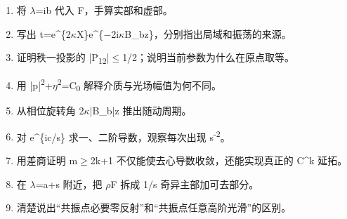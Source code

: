 \begin{enumerate}[leftmargin=2em]
\item 将 \ensuremath{\lambda}=ib 代入 F，手算实部和虚部。
\item 写出 t=e\textasciicircum{}\{2\ensuremath{\kappa}X\}e\textasciicircum{}\{\ensuremath{-}2i\ensuremath{\kappa}B\_bz\}，分别指出局域和振荡的来源。
\item 证明秩一投影的 |P\textsubscript{1}\textsubscript{2}|\ensuremath{\le}1/2；说明当前参数为什么在原点取等。
\item 用 |p|\textsuperscript{2}+\ensuremath{\eta}\textsuperscript{2}=C\textsubscript{0} 解释介质与光场幅值为何不同。
\item 从相位旋转角 2\ensuremath{\kappa}|B\_b|z 推出随动周期。
\item 对 e\textasciicircum{}\{ic/s\} 求一、二阶导数，观察每次出现 s\textsuperscript{-}\textsuperscript{2}。
\item 用差商证明 m\ensuremath{\ge}2k+1 不仅能使去心导数收敛，还能实现真正的 C\textasciicircum{}k 延拓。
\item 在 \ensuremath{\lambda}=a+s 附近，把 \ensuremath{\rho}F 拆成 1/s 奇异主部加可去部分。
\item 清楚说出“共振点必要零反射”和“共振点任意高阶光滑”的区别。
\end{enumerate}


